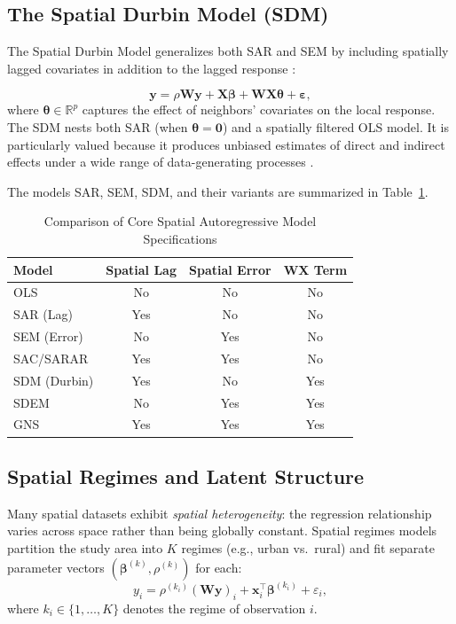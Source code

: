 \documentclass[conference]{IEEEtran}
\theoremstyle{definition}
\begin{document}
\subsection{The Spatial Durbin Model (SDM)}

The Spatial Durbin Model generalizes both SAR and SEM by including spatially lagged covariates in addition to the lagged response \cite{lesage2009introduction,elhorst2010applied}:

\begin{equation}
\label{eq:sdm}
\mathbf{y} = \rho\mathbf{W}\mathbf{y} + \mathbf{X}\bm{\beta} + \mathbf{W}\mathbf{X}\bm{\theta} + \bm{\varepsilon},
\end{equation}
where $\bm{\theta} \in \mathbb{R}^p$ captures the effect of neighbors' covariates on the local response. The SDM nests both SAR (when $\bm{\theta} = \mathbf{0}$) and a spatially filtered OLS model. It is particularly valued because it produces unbiased estimates of direct and indirect effects under a wide range of data-generating processes \cite{lesage2009introduction}.

The models SAR, SEM, SDM, and their variants are summarized in Table~\ref{tab:models}.

\begin{table}[t]
\centering
\caption{Comparison of Core Spatial Autoregressive Model Specifications}
\label{tab:models}
\begin{tabular}{lccc}
\toprule
\textbf{Model} & \textbf{Spatial Lag} & \textbf{Spatial Error} & \textbf{WX Term} \\
\midrule
OLS             & No   & No   & No  \\
SAR (Lag)       & Yes  & No   & No  \\
SEM (Error)     & No   & Yes  & No  \\
SAC/SARAR       & Yes  & Yes  & No  \\
SDM (Durbin)    & Yes  & No   & Yes \\
SDEM            & No   & Yes  & Yes \\
GNS             & Yes  & Yes  & Yes \\
\bottomrule
\end{tabular}
\end{table}

\subsection{Spatial Regimes and Latent Structure}

Many spatial datasets exhibit \emph{spatial heterogeneity}: the regression relationship varies across space rather than being globally constant. Spatial regimes models \cite{anselin1988spatial} partition the study area into $K$ regimes (e.g., urban vs.\ rural) and fit separate parameter vectors $(\bm{\beta}^{(k)}, \rho^{(k)})$ for each:
\begin{equation}
y_i = \rho^{(k_i)} (\mathbf{W}\mathbf{y})_i + \mathbf{x}_i^\top \bm{\beta}^{(k_i)} + \varepsilon_i,
\end{equation}
where $k_i \in \{1,\ldots,K\}$ denotes the regime of observation $i$.
\end{document}

